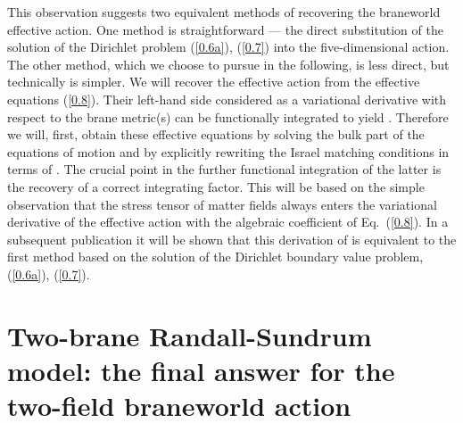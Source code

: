 \documentclass[a4paper,preprint,nofootinbib,
                 showpacs,preprintnumbers,amsmath,amssymb]{revtex4}
\begin{document}
This observation suggests two equivalent methods of recovering the braneworld 
effective action. One method is straightforward --- the direct substitution of 
the solution \coordHE{} of the Dirichlet problem 
(\ref{0.6a}), (\ref{0.7}) into the five-dimensional action. The other method, 
which we choose to pursue in the following, is less direct, but technically is 
simpler. We will recover the effective action from the effective equations 
(\ref{0.8}).  Their left-hand side considered as a variational derivative with 
respect to the brane metric(s) \coordHE{} can be functionally integrated to 
yield \coordHE{}.  Therefore we will, first, obtain these 
effective equations by solving the bulk part of the equations of motion and by 
explicitly rewriting the Israel matching conditions in terms of \coordHE{}. 
The crucial point in the further functional integration of the latter is the 
recovery of a correct integrating factor.  This will be based on the simple 
observation that the stress tensor of matter fields always enters the 
variational derivative of the effective action with the algebraic coefficient 
\coordHE{} of Eq.~(\ref{0.8}). In a subsequent publication \cite{duality}  
it will be shown that this derivation of \coordHE{} is  
equivalent to 
the first method based on the solution of the Dirichlet boundary value 
problem, (\ref{0.6a}), (\ref{0.7}). 
 
 
\section{Two-brane Randall-Sundrum model: the final answer 
for the two-field braneworld action\label{answer}} 
 
\end{document}
